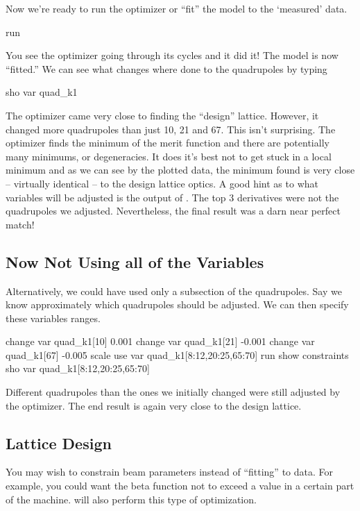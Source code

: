 Now we're ready to run the optimizer or ``fit'' the model to the
`measured' data.
\begin{example}
  run
\end{example}
You see the optimizer going through its cycles and it did it! The
model is now ``fitted.'' We can see what changes where done to the
quadrupoles by typing
\begin{example}
  sho var quad\_k1
\end{example}
The optimizer came very close to finding the ``design''
lattice. However, it changed more quadrupoles than just 10, 21 and
67. This isn't surprising. The optimizer finds the minimum of the
merit function and there are potentially many minimums, or
degeneracies.  It does it's best not to get stuck in a local minimum
and as we can see by the plotted data, the minimum found is very close
-- virtually identical -- to the design lattice optics.  A good hint
as to what variables will be adjusted is the output of .  The top 3 derivatives were not the quadrupoles we
adjusted. Nevertheless, the final result was a darn near perfect
match!

\subsection{Now Not Using all of the Variables}
\label{ss:fix_it_not_all}

Alternatively, we could have used only a subsection of the
quadrupoles. Say we know approximately which quadrupoles should be
adjusted. We can then specify these variables ranges.
\begin{example}
  change var quad\_k1[10]   0.001
  change var quad\_k1[21]  -0.001
  change var quad\_k1[67]  -0.005
  scale
  use var quad\_k1[8:12,20:25,65:70]
  run
  show constraints
  sho var quad\_k1[8:12,20:25,65:70]
\end{example}
Different quadrupoles than the ones we initially changed were still
adjusted by the optimizer. The end result is again very close to the
design lattice.

\subsection{Lattice Design}
\label{ss:lattice_design}

You may wish to constrain beam parameters instead of ``fitting'' to
data. For example, you could want the beta function not to exceed a
value in a certain part of the machine. \tao will also perform this
type of optimization.

